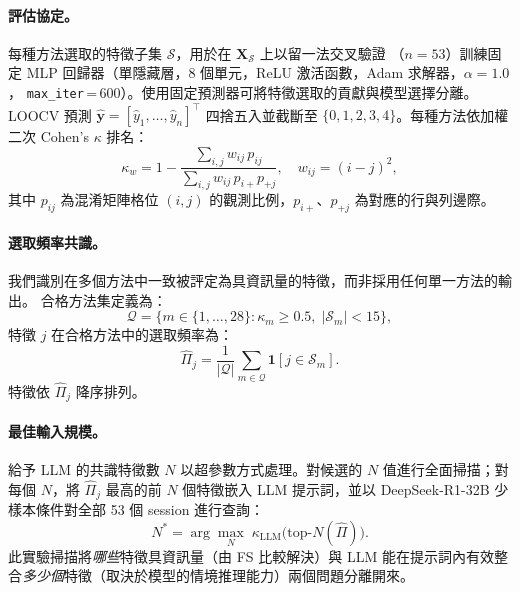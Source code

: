 \documentclass[12pt, a4paper]{article}
\begin{document}
\paragraph{評估協定。}
每種方法選取的特徵子集 $\mathcal{S}$，用於在 $\mathbf{X}_{\mathcal{S}}$ 上以留一法交叉驗證
（$n = 53$）訓練固定 MLP 回歸器（單隱藏層，8 個單元，ReLU 激活函數，Adam 求解器，$\alpha = 1.0$，
\texttt{max\_iter}\,=\,600）。使用固定預測器可將特徵選取的貢獻與模型選擇分離。LOOCV 預測
$\hat{\mathbf{y}} = [\hat{y}_1, \ldots, \hat{y}_n]^{\top}$ 四捨五入並截斷至
$\{0,1,2,3,4\}$。每種方法依加權二次 Cohen's $\kappa$ 排名：
\begin{equation}
    \kappa_w = 1 - \frac{\sum_{i,j} w_{ij}\,p_{ij}}{\sum_{i,j} w_{ij}\,p_{i+}p_{+j}},
    \quad w_{ij} = (i - j)^2,
    \label{eq:kappa}
\end{equation}
其中 $p_{ij}$ 為混淆矩陣格位 $(i,j)$ 的觀測比例，$p_{i+}$、$p_{+j}$ 為對應的行與列邊際。

\paragraph{選取頻率共識。}
我們識別在多個方法中一致被評定為具資訊量的特徵，而非採用任何單一方法的輸出。
合格方法集定義為：
\begin{equation}
    \mathcal{Q} = \bigl\{m \in \{1,\ldots,28\} : \kappa_m \geq 0.5,\;
        |\mathcal{S}_m| < 15\bigr\},
    \label{eq:qualify}
\end{equation}
特徵 $j$ 在合格方法中的選取頻率為：
\begin{equation}
    \hat{\Pi}_j = \frac{1}{|\mathcal{Q}|}
        \sum_{m \in \mathcal{Q}} \mathbf{1}[j \in \mathcal{S}_m].
    \label{eq:freq}
\end{equation}
特徵依 $\hat{\Pi}_j$ 降序排列。

\paragraph{最佳輸入規模。}
給予 LLM 的共識特徵數 $N$ 以超參數方式處理。對候選的 $N$ 值進行全面掃描；對每個 $N$，將 $\hat{\Pi}_j$ 最高的前 $N$ 個特徵嵌入 LLM 提示詞，並以 DeepSeek-R1-32B 少樣本條件對全部 53 個 session 進行查詢：
\begin{equation}
    N^{*} = \arg\max_{N}\;
        \kappa_{\mathrm{LLM}}\!\bigl(\mathrm{top}\text{-}N(\hat{\Pi})\bigr).
    \label{eq:nstar}
\end{equation}
此實驗掃描將\emph{哪些}特徵具資訊量（由 FS 比較解決）與 LLM 能在提示詞內有效整合\emph{多少個}特徵（取決於模型的情境推理能力）兩個問題分離開來。
\end{document}
